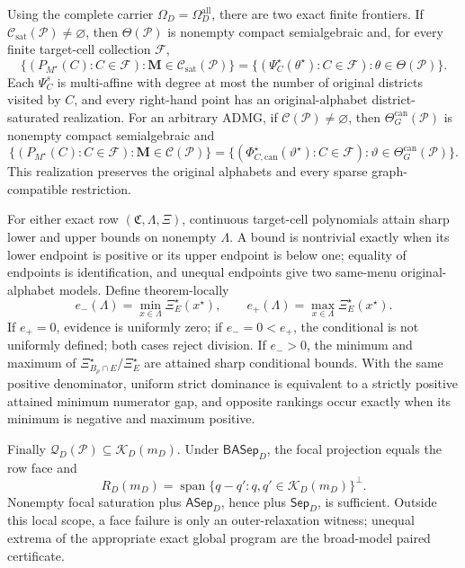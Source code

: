 Using the complete carrier \(\Omega_D=\Omega_D^{\mathrm{all}}\), there are two exact finite frontiers.  If \(\mathcal C_{\mathrm{sat}}(\mathcal P)\ne\varnothing\), then \(\Theta(\mathcal P)\) is nonempty compact semialgebraic and, for every finite target-cell collection \(\mathcal F\),
\[
\{(P_{M^\star}(C):C\in\mathcal F):\mathbf M\in\mathcal C_{\mathrm{sat}}(\mathcal P)\}
=\{(\Psi_C^\star(\theta^\star):C\in\mathcal F):\theta\in\Theta(\mathcal P)\}.
\]
Each \(\Psi_C^s\) is multi-affine with degree at most the number of original districts visited by \(C\), and every right-hand point has an original-alphabet district-saturated realization.  For an arbitrary ADMG, if \(\mathcal C(\mathcal P)\ne\varnothing\), then \(\Theta_G^{\mathrm{can}}(\mathcal P)\) is nonempty compact semialgebraic and
\[
\{(P_{M^\star}(C):C\in\mathcal F):\mathbf M\in\mathcal C(\mathcal P)\}
=\{(\Phi_{C,\mathrm{can}}^\star(\vartheta^\star):C\in\mathcal F):\vartheta\in\Theta_G^{\mathrm{can}}(\mathcal P)\}.
\]
This realization preserves the original alphabets and every sparse graph-compatible restriction.

For either exact row \((\mathfrak C,\Lambda,\Xi)\), continuous target-cell polynomials attain sharp lower and upper bounds on nonempty \(\Lambda\).  A bound is nontrivial exactly when its lower endpoint is positive or its upper endpoint is below one; equality of endpoints is identification, and unequal endpoints give two same-menu original-alphabet models.  Define theorem-locally
\[
e_-(\Lambda)=\min_{x\in\Lambda}\Xi_E^\star(x^\star),\qquad
e_+(\Lambda)=\max_{x\in\Lambda}\Xi_E^\star(x^\star).
\]
If \(e_+=0\), evidence is uniformly zero; if \(e_-=0<e_+\), the conditional is not uniformly defined; both cases reject division.  If \(e_->0\), the minimum and maximum of \(\Xi_{B_\rho\cap E}^\star/\Xi_E^\star\) are attained sharp conditional bounds.  With the same positive denominator, uniform strict dominance is equivalent to a strictly positive attained minimum numerator gap, and opposite rankings occur exactly when its minimum is negative and maximum positive.

Finally \(\mathcal Q_D(\mathcal P)\subseteq\mathcal K_D(m_D)\).  Under \(\mathsf{BASep}_D\), the focal projection equals the row face and
\[
R_D(m_D)=\operatorname{span}\{q-q':q,q'\in\mathcal K_D(m_D)\}^{\perp}.
\]
Nonempty focal saturation plus \(\mathsf{ASep}_D\), hence plus \(\mathsf{Sep}_D\), is sufficient.  Outside this local scope, a face failure is only an outer-relaxation witness; unequal extrema of the appropriate exact global program are the broad-model paired certificate.